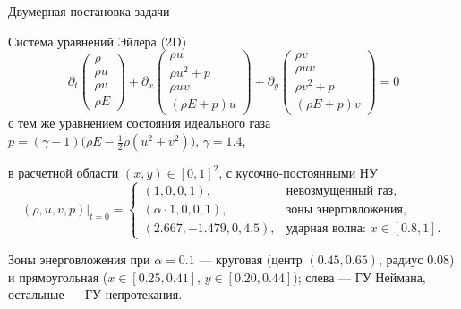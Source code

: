\documentclass[ignoreonframetext,unicode,aspectratio=169]{beamer}
\begin{document}
	\begin{frame}{Двумерная постановка задачи}

		\begin{block}{Система уравнений Эйлера (2D)}
			\[
			\partial_t \begin{pmatrix} \rho \\ \rho u \\ \rho v \\ \rho E \end{pmatrix} +
			\partial_x \begin{pmatrix} \rho u \\ \rho u^2 + p \\ \rho u v \\ (\rho E + p)u \end{pmatrix} +
			\partial_y \begin{pmatrix} \rho v \\ \rho u v \\ \rho v^2 + p \\ (\rho E + p)v \end{pmatrix} = 0
			\]
			с тем же уравнением состояния идеального газа $p = (\gamma - 1)\big(\rho E - \tfrac{1}{2}\rho (u^2 + v^2)\big)$, $\gamma = 1.4$,
		\end{block}
		
		\vspace{-0.1 cm}

		в расчетной области $(x, y) \in [0, 1]^2$, с кусочно-постоянными НУ
		\vspace{-0.15 cm}
		\[
		(\rho, u, v, p)|_{t=0} =
		\begin{cases}
			(1, 0, 0, 1), & \text{невозмущенный газ,} \\
			(\alpha \cdot 1, 0, 0, 1), & \text{зоны энерговложения,} \\
			(2.667, -1.479, 0, 4.5), & \text{ударная волна: } x \in [0.8, 1].
		\end{cases}
		\]

		\vspace{-0.2 cm}
		Зоны энерговложения при $\alpha = 0.1$ --- круговая (центр $(0.45, 0.65)$, радиус $0.08$) и прямоугольная ($x \in [0.25, 0.41]$, $y \in [0.20, 0.44]$); слева  --- ГУ Неймана, остальные --- ГУ непротекания.

	\end{frame}
	
\end{document}
